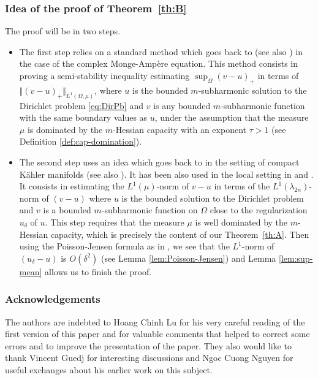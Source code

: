 \subsubsection*{Idea of the proof of Theorem~\ref{th:B}}
The proof will be in two steps.
\begin{itemize}
\item
The first step relies on a standard method which goes back to \cite{EGZ09} (see also \cite{GKZ08}) in the case of the complex Monge-Ampère equation. This method consists in proving a semi-stability inequality estimating
$ \sup_{\Omega} (v-u)_+ $ in terms of $\Vert (v-u)_+\Vert_{L^{1} (\Omega,\mu)}$, where $u $ is the bounded $m$-subharmonic solution to the Dirichlet problem \eqref{eq:DirPb} and $v$ is any bounded $m$-subharmonic function with the same boundary values as $u$, under the assumption that the measure $\mu$ is dominated by the $m$-Hessian capacity with an exponent $\tau > 1$ (see Definition \ref{def:cap-domination}).

\item
The second step uses an idea which goes back to \cite{DDGKPZ15} in the setting of compact Kähler manifolds (see also \cite{GZ17}). It has been also used in the local setting in \cite{N18a} and \cite{KN19}. It consists in estimating the $L^1 (\mu)$-norm of $v - u$ in terms of the $L^1 (\lambda_{2 n})$-norm of $(v-u)$ where $u$ is the bounded solution to the Dirichlet problem and $v$ is a bounded $m$-subharmonic function on $\Omega$ close to the regularization $ u_\delta$ of $u$. This step requires that the measure $\mu$ is well dominated by the $m$-Hessian capacity, which is precisely the content of our Theorem~\ref{th:A}.
Then using the Poisson-Jensen formula as in \cite{GKZ08}, we see that the $L^1$-norm of $(u_\delta-u)$ is $O (\delta^2)$ (see Lemma \ref{lem:Poisson-Jensen}) and Lemma \ref{lem:sup-mean} allows us to finish the proof.
\end{itemize}

\subsubsection*{Acknowledgements}
The authors are indebted to Hoang Chinh Lu for his very careful reading of the first version of this paper and for valuable comments that helped to correct some errors and to improve the presentation of the paper. They also would like to thank Vincent Guedj for interesting discussions and Ngoc Cuong Nguyen for useful exchanges about his earlier work on this subject.

